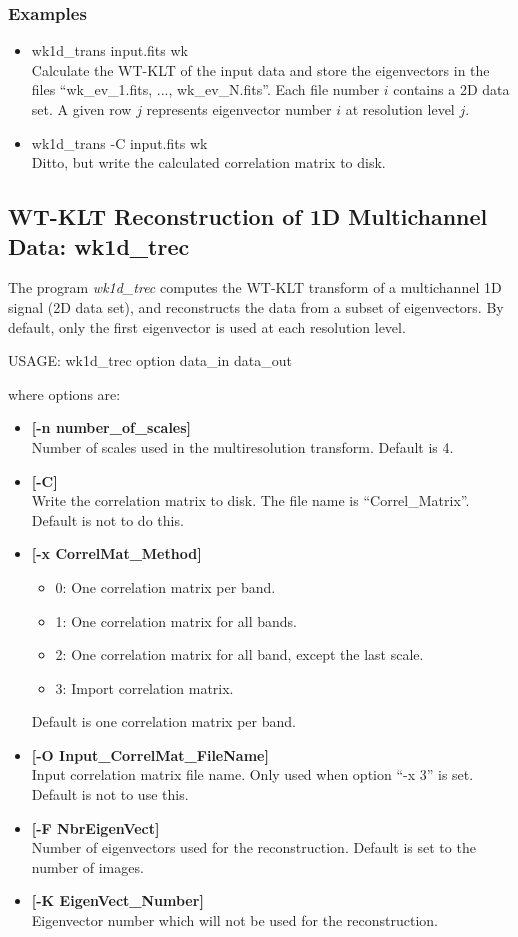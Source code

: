 \subsubsection*{Examples}
\begin{itemize}
\item wk1d\_trans input.fits wk \\
Calculate the WT-KLT of the input data and store the eigenvectors
in the files ``wk\_ev\_1.fits, ..., wk\_ev\_N.fits''. Each file number $i$ 
contains a 2D data set. A given row $j$  represents eigenvector 
number $i$ at resolution level $j$. 
\item wk1d\_trans -C input.fits wk \\
Ditto, but write the calculated correlation matrix to disk.
\end{itemize}

\subsection{WT-KLT Reconstruction of 1D Multichannel Data: wk1d\_trec}
The program 
{\em wk1d\_trec} computes the WT-KLT  transform of 
a multichannel 1D signal (2D data set), and reconstructs the data from
a subset of eigenvectors. By default, only the first eigenvector is
used at each resolution level.
{\bf
\begin{center}
 USAGE: wk1d\_trec option data\_in data\_out
\end{center}}
where options are: 
\begin{itemize} 
\baselineskip=0.4truecm
\itemsep=0.1truecm
\item {\bf [-n number\_of\_scales]} \\
 Number of scales used in the multiresolution transform.
 Default is 4.
\item {\bf [-C]} \\
Write the correlation matrix to disk. 
The file name is ``Correl\_Matrix''. Default is not to do this.
\item {\bf [-x CorrelMat\_Method]}
{\small
\begin{itemize}   
\baselineskip=0.4truecm
\itemsep=0.1truecm          
\item{0:} One correlation matrix per band. 
\item{1:} One correlation matrix for all bands. 
\item{2:} One correlation matrix for all band, except the last scale. 
\item{3:} Import correlation matrix.
\end{itemize}
Default is one correlation matrix per band.
}             
\item {\bf [-O Input\_CorrelMat\_FileName]} \\
Input correlation matrix file name.
Only used when option ``-x 3'' is set. Default is not to use this. 
\item {\bf [-F NbrEigenVect]} \\
Number of eigenvectors used for the reconstruction. 
Default is set to the number of images.
\item {\bf [-K EigenVect\_Number]} \\
Eigenvector number which will not be used for the reconstruction. 
\end{itemize}
